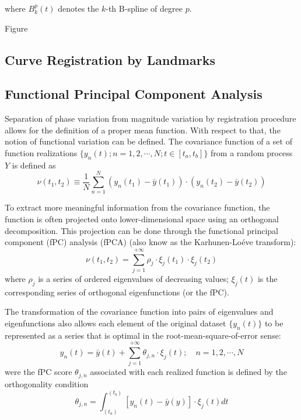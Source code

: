 where $B_k^p (t)$ denotes the $k$-th B-spline of degree $p$.

Figure

\subsection{Curve Registration by Landmarks}\label{sub:sa_registration}

\subsection{Functional Principal Component Analysis}\label{sub:sa_fpca}

Separation of phase variation from magnitude variation by registration procedure allows for the definition of a proper mean function.
With respect to that, the notion of functional variation can be defined.
The covariance function of a set of function realizations $\{y_n(t);n = 1, 2, \cdots, N; t \in [t_a,t_b]\}$ from a random process $Y$ is defined as
\begin{equation}
	\nu (t_1, t_2) \equiv \frac{1}{N} \sum_{n=1}^{N} (y_n(t_1) - \bar{y}(t_1)) \cdot (y_n(t_2) - \bar{y}(t_2))
\label{eq:covariance_function}
\end{equation}

To extract more meaningful information from the covariance function, the function is often projected onto lower-dimensional space using an orthogonal decomposition.
This projection can be done through the functional principal component (fPC) analysis (fPCA) (also know as the Karhunen-Lo\'eve transform):
\begin{equation}
	\nu (t_1, t_2) = \sum_{j=1}^{+\infty} \rho_j \cdot \xi_j(t_1) \cdot \xi_j(t_2)
\label{eq:kl_transform}
\end{equation}
where $\rho_j$ is a series of ordered eigenvalues of decreasing values; 
$\xi_j(t)$ is the corresponding series of orthogonal eigenfunctions (or the fPC).

The transformation of the covariance function into pairs of eigenvalues and eigenfunctions also allows each element of the original dataset $\{y_n(t)\}$ to be represented as a series that is optimal in the root-mean-square-of-error sense:
\begin{equation}
  y_n(t) = \bar{y}(t) + \sum_{j=1}^{+\infty} \theta_{j,n} \cdot \xi_j (t); \quad n = 1, 2, \cdots, N
\label{eq:pod}
\end{equation}
were the fPC score $\theta_{j,n}$ associated with each realized function is defined by the orthogonality condition
\begin{equation}
  \theta_{j,n} = \int_(t_a)^(t_b) \left[y_n(t) - \bar{y}(y)\right] \cdot \xi_j (t) dt
\label{eq:pod_orthogonality}
\end{equation}


